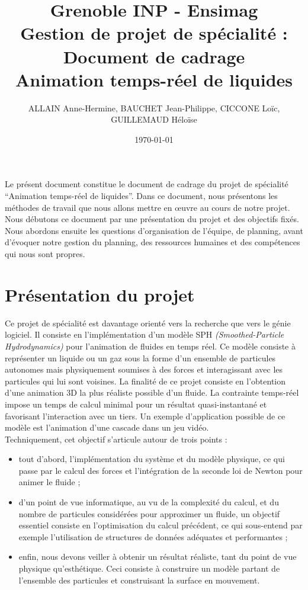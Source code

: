 \documentclass[a4paper,11pt]{article}
\title{\normalsize Grenoble INP - Ensimag \\ Gestion de projet de spécialité : Document de cadrage \\ Animation temps-réel de liquides}
\author{\small ALLAIN Anne-Hermine, BAUCHET Jean-Philippe, CICCONE Loïc, GUILLEMAUD Héloïse}
\date{\small \today}
\begin{document}
\maketitle

Le présent document constitue le document de cadrage du projet de spécialité ``Animation temps-réel de liquides''. Dans ce document, nous présentons les méthodes de travail que nous allons mettre en \oe{}uvre au cours de notre projet. Nous débutons ce document par une présentation du projet et des objectifs fixés. Nous abordons ensuite les questions d'organisation de l'équipe, de planning, avant d'évoquer notre gestion du planning, des ressources humaines et des compétences qui nous sont propres.

\section{Présentation du projet}

Ce projet de spécialité est davantage orienté vers la recherche que vers le génie logiciel. Il consiste en l'implémentation d'un modèle SPH {\em (Smoothed-Particle Hydrodynamics)} pour l'animation de fluides en temps réel. Ce modèle consiste à représenter un liquide ou un gaz sous la forme d'un ensemble de particules autonomes mais physiquement soumises à des forces et interagissant avec les particules qui lui sont voisines. La finalité de ce projet consiste en l'obtention d'une animation 3D la plus réaliste possible d'un fluide. La contrainte temps-réel impose un temps de calcul minimal pour un résultat quasi-instantané et favorisant l'interaction avec un tiers. Un exemple d'application possible de ce modèle est l'animation d'une cascade dans un jeu vidéo. \\

Techniquement, cet objectif s'articule autour de trois points : \\

\begin{itemize}
\item tout d'abord, l'implémentation du système et du modèle physique, ce qui passe par le calcul des forces et l'intégration de la seconde loi de Newton pour animer le fluide ;
\item d'un point de vue informatique, au vu de la complexité du calcul, et du nombre de particules considérées pour approximer un fluide, un objectif essentiel consiste en l'optimisation du calcul précédent, ce qui sous-entend par exemple l'utilisation de structures de données adéquates et performantes ;
\item enfin, nous devons veiller à obtenir un résultat réaliste, tant du point de vue physique qu'esthétique. Ceci consiste à construire un modèle partant de l'ensemble des particules et construisant la surface en mouvement. \\
\end{itemize}
\end{document}
